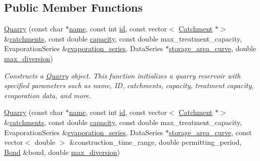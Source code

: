 \subsection*{Public Member Functions}
\begin{DoxyCompactItemize}
\item 
\mbox{\hyperlink{classQuarry_a126fddda9e5deeb667a6a9dbb0533470}{Quarry}} (const char $\ast$\mbox{\hyperlink{classWaterSource_a846ea74c5b453d014f594d41fee8c765}{name}}, const int \mbox{\hyperlink{classWaterSource_a6eafe5dfefd317877d1244e8a7c6e742}{id}}, const vector$<$ \mbox{\hyperlink{classCatchment}{Catchment}} $\ast$$>$ \&\mbox{\hyperlink{classWaterSource_a8c18c34f23f8a06685c1d12f462ed830}{catchments}}, const double \mbox{\hyperlink{classWaterSource_a2ec257b415b248214a8bce7fc5267723}{capacity}}, const double max\+\_\+treatment\+\_\+capacity, Evaporation\+Series \&\mbox{\hyperlink{classReservoir_a2d2d9b302c13703309bb798d24136810}{evaporation\+\_\+series}}, Data\+Series $\ast$\mbox{\hyperlink{classReservoir_a46bd5b750963dfa9a57b247fd77ab8ff}{storage\+\_\+area\+\_\+curve}}, double \mbox{\hyperlink{classQuarry_a5cb60f94475d5991a795cb9117e0b83f}{max\+\_\+diversion}})
\begin{DoxyCompactList}\small\item\em Constructs a \mbox{\hyperlink{classQuarry}{Quarry}} object. This function initializes a quarry reservoir with specified parameters such as name, ID, catchments, capacity, treatment capacity, evaporation data, and more. \end{DoxyCompactList}\item 
\mbox{\hyperlink{classQuarry_a13cc1caeda6846900893f8d24c49b111}{Quarry}} (const char $\ast$\mbox{\hyperlink{classWaterSource_a846ea74c5b453d014f594d41fee8c765}{name}}, const int \mbox{\hyperlink{classWaterSource_a6eafe5dfefd317877d1244e8a7c6e742}{id}}, const vector$<$ \mbox{\hyperlink{classCatchment}{Catchment}} $\ast$$>$ \&\mbox{\hyperlink{classWaterSource_a8c18c34f23f8a06685c1d12f462ed830}{catchments}}, const double \mbox{\hyperlink{classWaterSource_a2ec257b415b248214a8bce7fc5267723}{capacity}}, const double max\+\_\+treatment\+\_\+capacity, Evaporation\+Series \&\mbox{\hyperlink{classReservoir_a2d2d9b302c13703309bb798d24136810}{evaporation\+\_\+series}}, Data\+Series $\ast$\mbox{\hyperlink{classReservoir_a46bd5b750963dfa9a57b247fd77ab8ff}{storage\+\_\+area\+\_\+curve}}, const vector$<$ double $>$ \&construction\+\_\+time\+\_\+range, double permitting\+\_\+period, \mbox{\hyperlink{classBond}{Bond}} \&bond, double \mbox{\hyperlink{classQuarry_a5cb60f94475d5991a795cb9117e0b83f}{max\+\_\+diversion}})

\end{DoxyCompactItemize}
